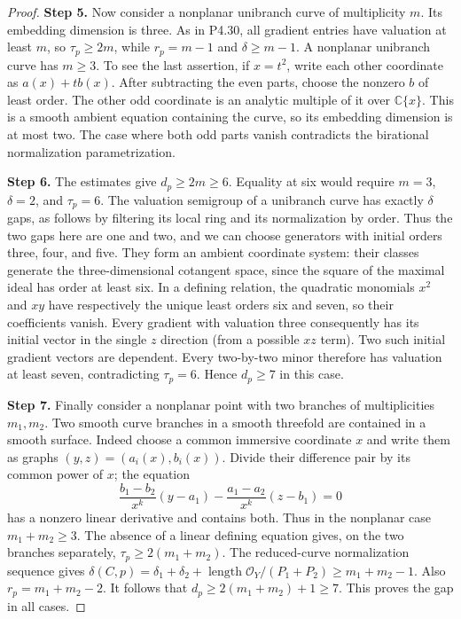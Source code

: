 \begin{proof}
\noindent\textbf{Step 5.} Now consider a nonplanar unibranch curve of multiplicity
$m$. Its embedding dimension is three. As in P4.30,
all gradient entries have valuation at least $m$, so
$\tau_p\ge2m$, while $r_p=m-1$ and
$\delta\ge m-1$. A nonplanar unibranch curve has
$m\ge3$. To see the last assertion, if $x=t^2$, write
each other coordinate as $a(x)+t b(x)$. After subtracting
the even parts, choose the nonzero $b$ of least order.
The other odd coordinate is an analytic multiple of it
over $\mathbb C\{x\}$. This is a smooth ambient equation
containing the curve, so its embedding dimension is at
most two. The case where both odd parts vanish contradicts
the birational normalization parametrization.

\noindent\textbf{Step 6.} The estimates give $d_p\ge2m\ge6$. Equality at six
would require $m=3$, $\delta=2$, and $\tau_p=6$.
The valuation semigroup of a unibranch curve has exactly
$\delta$ gaps, as follows by filtering its local ring
and its normalization by order. Thus the two gaps here
are one and two, and we can choose generators with
initial orders three, four, and five. They form an
ambient coordinate system: their classes generate the
three-dimensional cotangent space, since the square
of the maximal ideal has order at least six.
In a defining relation, the quadratic monomials
$x^2$ and $xy$ have respectively the unique least
orders six and seven, so their coefficients vanish.
Every gradient with valuation three consequently has
its initial vector in the single $z$ direction
(from a possible $xz$ term). Two such initial
gradient vectors are dependent. Every two-by-two
minor therefore has valuation at least seven,
contradicting $\tau_p=6$. Hence $d_p\ge7$ in this case.

\noindent\textbf{Step 7.} Finally consider a nonplanar point with two branches
of multiplicities $m_1,m_2$. Two smooth curve branches
in a smooth threefold are contained in a smooth
surface. Indeed choose a common immersive coordinate
$x$ and write them as graphs
$(y,z)=(a_i(x),b_i(x))$. Divide their difference pair
by its common power of $x$; the equation
\[
 \frac{b_1-b_2}{x^k}(y-a_1)
 -\frac{a_1-a_2}{x^k}(z-b_1)=0
\]
has a nonzero linear derivative and contains both.
Thus in the nonplanar case $m_1+m_2\ge3$.
The absence of a linear defining equation gives,
on the two branches separately,
$\tau_p\ge2(m_1+m_2)$.
The reduced-curve normalization sequence gives
$\delta(C,p)=\delta_1+\delta_2+
\operatorname{length}\mathcal O_Y/(P_1+P_2)
\ge m_1+m_2-1$.
Also $r_p=m_1+m_2-2$.
It follows that
$d_p\ge2(m_1+m_2)+1\ge7$.
This proves the gap in all cases.


\end{proof}
